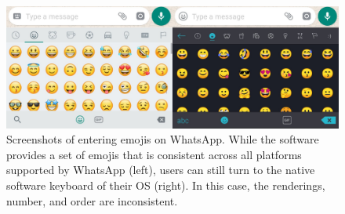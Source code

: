 \begin{figure}
	\centering
	\includegraphics[width=0.7\linewidth]{figures/emojipasswords/app-vs-platform-emojis}
	\caption{\label{fig:emojipasswords.app-vs-platform-emojis}
		Screenshots of entering emojis on WhatsApp. While the software provides a set of emojis that is consistent across all platforms supported by WhatsApp (left), users can still turn to the native software keyboard of their OS (right). In this case, the renderings, number, and order are inconsistent.
	}
\end{figure}








